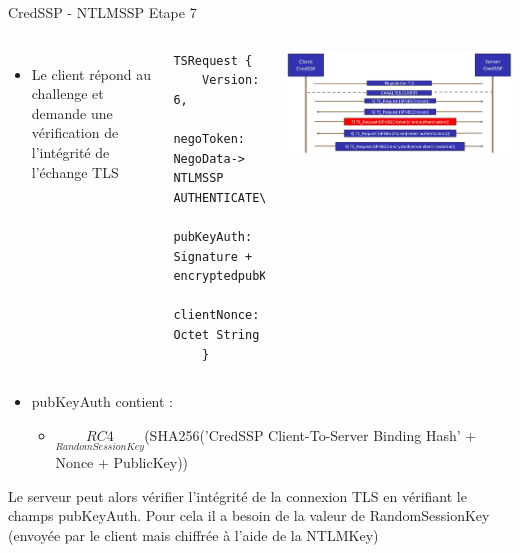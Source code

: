 \documentclass{beamer}
\begin{document}
\begin{frame}[fragile]{CredSSP - NTLMSSP Etape 7}
	 \begin{columns}[T]
	 	\begin{itemize}
	 	\item Le client répond au challenge et demande une vérification de l'intégrité de l'échange TLS
	 	\end{itemize}
	 \begin{lstlisting}[frame=single,basicstyle=\tiny]
TSRequest {
	Version:     6,
	negoToken:   NegoData-> NTLMSSP AUTHENTICATE\_MESSAGE,
	pubKeyAuth: Signature + encryptedpubKey,
	clientNonce: Octet String
	}
	\end{lstlisting}
	 \includegraphics[scale=0.07]{step7.jpg}
	 \end{columns}
	 
	 \begin{itemize}
	 	\item pubKeyAuth contient :
	 		\begin{itemize}
	 		\item $\underset{RandomSessionKey}{RC4}$(SHA256('CredSSP Client-To-Server Binding Hash' + Nonce + PublicKey))
	 		\end{itemize}
	 	\end{itemize}
	 	
Le serveur peut alors vérifier l'intégrité de la connexion TLS en vérifiant le champs pubKeyAuth.
Pour cela il a besoin de la valeur de RandomSessionKey (envoyée par le client mais chiffrée à l'aide de la NTLMKey)
\end{frame}
\end{document}
